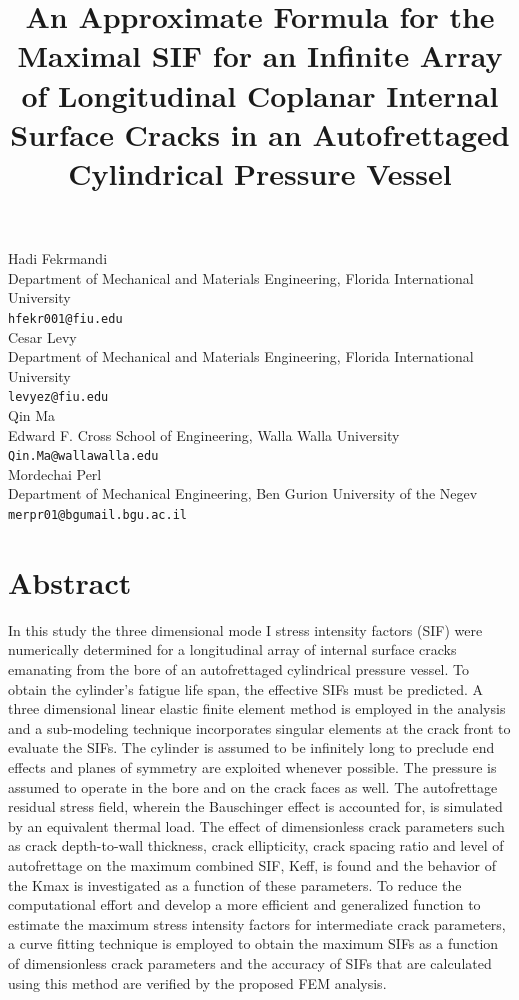 \documentclass[article,A4,11pt]{llncs}%
\begin{document}
\title{An Approximate Formula for the Maximal SIF for an Infinite Array of Longitudinal Coplanar Internal Surface Cracks in an Autofrettaged Cylindrical Pressure Vessel}
 \author{} \institute{}
\maketitle
\begin{center}
{\large Hadi  Fekrmandi}\\
Department of Mechanical and Materials Engineering, Florida International University\\
{\tt hfekr001@fiu.edu}
\\ \vspace{4mm}
{\large Cesar  Levy}\\
Department of Mechanical and Materials Engineering, Florida International University\\
{\tt levyez@fiu.edu}
\\ \vspace{4mm}
{\large Qin Ma}\\
Edward F. Cross School of Engineering, Walla Walla University\\
{\tt Qin.Ma@wallawalla.edu}
\\ \vspace{4mm}
{\large Mordechai Perl}\\
Department of Mechanical Engineering, Ben Gurion University of the Negev\\
{\tt merpr01@bgumail.bgu.ac.il}
\end{center}

\section*{Abstract}
In this study the three dimensional mode I stress intensity factors (SIF) were numerically determined for a longitudinal array of internal surface cracks emanating from the bore of an autofrettaged cylindrical pressure vessel. To obtain the cylinder’s fatigue life span, the effective SIFs must be predicted. 
A three dimensional linear elastic finite element method is employed in the analysis and a sub-modeling technique incorporates singular elements at the crack front to evaluate the SIFs. The cylinder is assumed to be infinitely long to preclude end effects and planes of symmetry are exploited whenever possible. The pressure is assumed to operate in the bore and on the crack faces as well. The autofrettage residual stress field, wherein the Bauschinger effect is accounted for, is simulated by an equivalent thermal load. The effect of dimensionless crack parameters such as crack depth-to-wall thickness, crack ellipticity, crack spacing ratio and level of autofrettage on the maximum combined SIF, Keff, is found and the behavior of the Kmax is investigated as a function of these parameters. 
    To reduce the computational effort and develop a more efficient and generalized function to estimate the maximum stress intensity factors for intermediate crack parameters, a curve fitting technique is employed to obtain the maximum SIFs as a function of dimensionless crack parameters and the accuracy of SIFs that are calculated using this method are verified by the proposed FEM analysis. 
\end{document}
